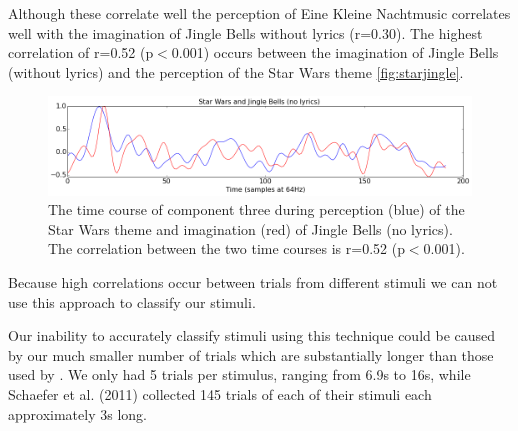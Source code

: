 Although these correlate well the perception of Eine Kleine Nachtmusic correlates well with the imagination of Jingle Bells without lyrics (r=0.30). 
The highest correlation of r=0.52 (p$<$0.001) occurs between the imagination of Jingle Bells (without lyrics) and the perception of the Star Wars theme \autoref{fig:starjingle}.
\begin{figure}[htbp]
  \centerline{\includegraphics[scale=0.4]{Figures/StarJingle}}
  \caption{The time course of component three during perception (blue) of the Star Wars theme and imagination (red) of Jingle Bells (no lyrics). The correlation between the two time courses is r=0.52 (p$<$0.001).}
  \label{fig:starjingle}
\end{figure}
Because high correlations occur between trials from different stimuli we can not use this approach to classify our stimuli.

Our inability to accurately classify stimuli using this technique could be caused by our much smaller number of trials which are substantially longer than those used by \cite{schaefer_name_2011}. 
We only had 5 trials per stimulus, ranging from 6.9s to 16s, while Schaefer et al. (2011) collected 145 trials of each of their stimuli each approximately 3s long.